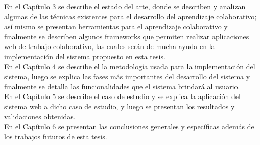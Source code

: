 En el Capítulo 3 se describe el estado del arte, donde se describen y analizan algunas de las técnicas existentes para el desarrollo del aprendizaje colaborativo; así mismo se presentan herramientas para el aprendizaje colaborativo y finalmente se describen algunos frameworks que permiten realizar aplicaciones web de trabajo colaborativo, las cuales serán de mucha ayuda en la implementación del sistema propuesto en esta tesis.\\

En el Capítulo 4 se describe el la metodología usada para la implementación del sistema, luego se explica las fases más importantes del desarrollo del sistema y finalmente se detalla las funcionalidades que el sistema brindará al usuario.\\

En el Capítulo 5 se describe el caso de estudio y se explica la aplicación del sistema web a dicho caso de estudio, y luego se presentan los resultados y validaciones obtenidas.\\

En el Capítulo 6 se presentan las conclusiones generales y específicas además de los trabajos futuros de esta tesis.

